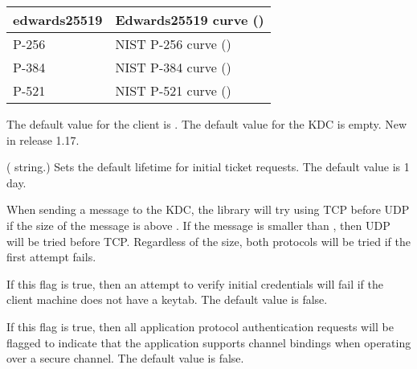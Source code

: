 \documentclass[letterpaper,10pt,english]{sphinxmanual}
\begin{document}
\begin{description}
\begin{savenotes}
\begin{tabulary}{\linewidth}[t]{|T|T|}
edwards25519
&
Edwards25519 curve ()
\\
\hline
P-256
&
NIST P-256 curve ()
\\
\hline
P-384
&
NIST P-384 curve ()
\\
\hline
P-521
&
NIST P-521 curve ()
\\
\hline
\end{tabulary}
\par
\sphinxattableend\end{savenotes}

The default value for the client is .  The default
value for the KDC is empty.  New in release 1.17.

\item[{\sphinxstylestrong{ticket\_lifetime}}] \leavevmode
( string.)  Sets the default lifetime for initial
ticket requests.  The default value is 1 day.

\item[{\sphinxstylestrong{udp\_preference\_limit}}] \leavevmode
When sending a message to the KDC, the library will try using TCP
before UDP if the size of the message is above
.  If the message is smaller than
, then UDP will be tried before TCP.
Regardless of the size, both protocols will be tried if the first
attempt fails.

\item[{\sphinxstylestrong{verify\_ap\_req\_nofail}}] \leavevmode
If this flag is true, then an attempt to verify initial
credentials will fail if the client machine does not have a
keytab.  The default value is false.

\item[{\sphinxstylestrong{client\_aware\_channel\_bindings}}] \leavevmode
If this flag is true, then all application protocol authentication
requests will be flagged to indicate that the application supports
channel bindings when operating over a secure channel.  The
default value is false.

\end{description}
\end{document}
